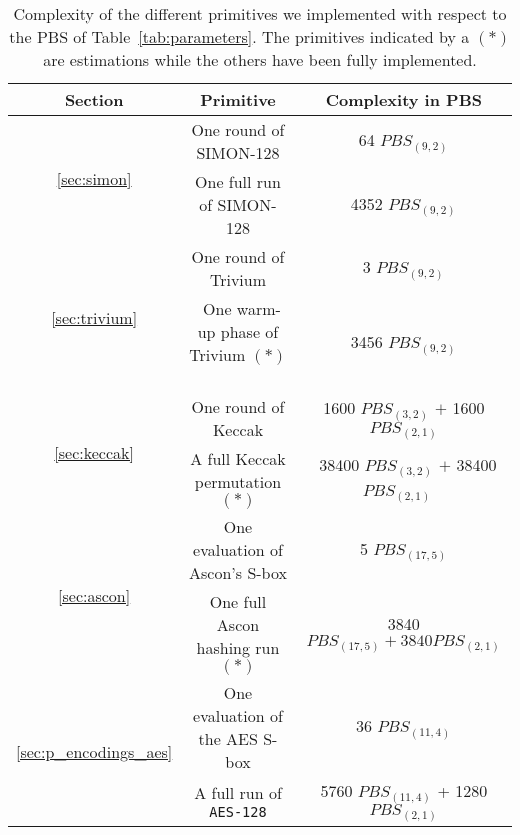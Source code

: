 \begin{table}
    \centering
    \begin{tabular}{|c|c|c|}
        \hline
        \textbf{Section} & \textbf{Primitive} & \textbf{Complexity in \gls{PBS}}  \\
        \hline
        \multirow{2}{*}{\ref{sec:simon}} & One round of SIMON-128 & 64 \texttt{$PBS_{(9, 2)}$}\\
        \cline{2-3}
        & One full run of SIMON-128 & 4352 \texttt{$PBS_{(9, 2)}$}\\
        \hline
        \multirow{2}{*}{\ref{sec:trivium}} & One round of Trivium & 3 \texttt{$PBS_{(9, 2)}$}\\
        \cline{2-3}
        & ~One warm-up phase of Trivium $(*)$~ & 3456 \texttt{$PBS_{(9, 2)}$}\\
        \hline
        \multirow{2}{*}{\ref{sec:keccak}} & One round of Keccak & 1600 \texttt{$PBS_{(3, 2)}$} $+$ 1600 \texttt{$PBS_{(2, 1)}$}\\
        \cline{2-3}
        & A full Keccak permutation $(*)$ & ~38400 \texttt{$PBS_{(3, 2)}$} $+$ 38400 \texttt{$PBS_{(2, 1)}$} ~\\
        \hline
      \multirow{2}{*}{ \ref{sec:ascon}} & One evaluation of Ascon's \gls{S-box} & 5 \texttt{$PBS_{(17, 5)}$}\\
      \cline{2-3}
      & One full Ascon hashing run $(*)$ & 3840 \texttt{$PBS_{(17, 5)} + 3840 PBS_{(2, 1)}$}\\
        \hline
        \multirow{2}{*}{\ref{sec:p_encodings_aes}} & One evaluation of the \gls{AES} \gls{S-box} & 36 \texttt{$PBS_{(11, 4)}$}\\
        \cline{2-3}
        & A full run of \texttt{\gls{AES}-128}  & 5760 \texttt{$PBS_{(11, 4)}$} + 1280 \texttt{$PBS_{(2, 1)}$}\\
        \hline
    \end{tabular}
    \medskip
    \caption{Complexity of the different primitives we implemented with respect to the \gls{PBS} of Table~\ref{tab:parameters}. The primitives indicated by a $(*)$ are estimations while the others have been fully implemented.}
    \label{tab:complexity_primitives}
\end{table}



